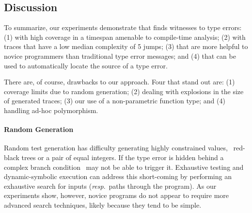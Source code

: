 

\subsection{Discussion}
\label{sec:nanomaly:discussion}

To summarize, our experiments demonstrate that \nanomaly finds witnesses
to type errors:
%
(1) with high coverage in a timespan amenable to compile-time analysis;
%
(2) with traces that have a low median complexity of 5 jumps;
%
(3) that are more helpful to novice programmers than traditional type
error messages; and
%
(4) that can be used to automatically locate the source of a type error.

There are, of course, drawbacks to our approach. Four that stand out
are:
%
(1) coverage limits due to random generation;
%
(2) dealing with explosions in the size of generated traces;
%
(3) our use of a non-parametric function type; and
%
(4) handling ad-hoc polymorphism.

\paragraph{Random Generation}
Random test generation has difficulty generating highly constrained
values, \eg\ red-black trees or a pair of equal integers. If the type
error is hidden behind a complex branch condition \nanomaly\ may not be
able to trigger it. Exhaustive testing and dynamic-symbolic execution
can address this short-coming by performing an exhaustive search for
inputs (\emph{resp}.\ paths through the program). As our experiments
show, however, novice programs do not appear to require more advanced
search techniques, likely because they tend to be simple.


